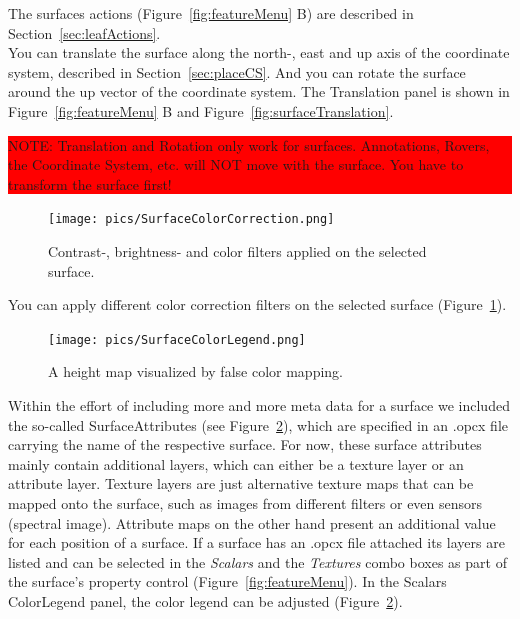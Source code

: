 The surfaces actions (Figure~\ref{fig:featureMenu} B) are described in Section~\ref{sec:leafActions}. \\


You can translate the surface along the north-, east and up axis of the coordinate system, described in Section~\ref{sec:placeCS}. And you can rotate the surface around the up vector of the coordinate system. The Translation panel is shown in Figure~\ref{fig:featureMenu} B and Figure~\ref{fig:surfaceTranslation}. \\

\begin{center}
\colorbox{red}{\parbox{1.0\textwidth}{NOTE: Translation and Rotation only work for surfaces. Annotations, Rovers, the Coordinate System, etc. will NOT move with the surface. You have to transform the surface first!}}
\end{center}

\begin{figure}[h]
    	\centering
    		\texttt{[image: pics/SurfaceColorCorrection.png]}
    	\caption[Surface Color Correction]{Contrast-, brightness- and color filters applied on the selected surface.}
    	\label{fig:surfaceColorCorrection}
   \end{figure}

You can apply different color correction filters on the selected surface	(Figure~\ref{fig:surfaceColorCorrection}). \\

\begin{figure}[h]
    	\centering
    		\texttt{[image: pics/SurfaceColorLegend.png]}
    	\caption[Surface Color Legend]{A height map visualized by false color mapping.}
    	\label{fig:surfaceColorLegend}
   \end{figure}
	
Within the effort of including more and more meta data for a surface we included the so-called SurfaceAttributes (see Figure~\ref{fig:surfaceColorLegend}),
which are specified in an .opcx file carrying the name of the respective surface.
For now, these surface attributes mainly contain additional layers, which can either be a texture layer or an attribute layer.
Texture layers are just alternative texture maps that can be mapped onto the surface, such as images from different filters or even sensors (spectral image). 
Attribute maps on the other hand present an additional value for each position of a surface. 
If a surface has an .opcx file attached its layers are listed and can be selected in the \textit{Scalars} and the \textit{Textures} combo boxes as part of the surface's property control (Figure~\ref{fig:featureMenu}). 
In the Scalars ColorLegend panel, the color legend can be adjusted (Figure~\ref{fig:surfaceColorLegend}).

